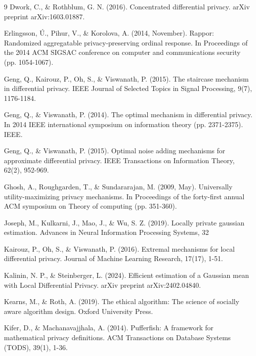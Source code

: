 \documentclass[a4paper, 11pt]{article}
\theoremstyle{definition}
\begin{document}
{\begin{thebibliography}{9}
 Dwork, C., \& Rothblum, G. N. (2016). Concentrated differential privacy. arXiv preprint arXiv:1603.01887.

 Erlingsson, Ú., Pihur, V., \& Korolova, A. (2014, November). Rappor: Randomized aggregatable privacy-preserving ordinal response. In Proceedings of the 2014 ACM SIGSAC conference on computer and communications security (pp. 1054-1067).

 Geng, Q., Kairouz, P., Oh, S., \& Viswanath, P. (2015). The staircase mechanism in differential privacy. IEEE Journal of Selected Topics in Signal Processing, 9(7), 1176-1184.

 Geng, Q., \& Viswanath, P. (2014). The optimal mechanism in differential privacy. In 2014 IEEE international symposium on information theory (pp. 2371-2375). IEEE.

 Geng, Q., \& Viswanath, P. (2015). Optimal noise adding mechanisms for approximate differential privacy. IEEE Transactions on Information Theory, 62(2), 952-969.

 Ghosh, A., Roughgarden, T., \& Sundararajan, M. (2009, May). Universally utility-maximizing privacy mechanisms. In Proceedings of the forty-first annual ACM symposium on Theory of computing (pp. 351-360).

 Joseph, M., Kulkarni, J., Mao, J., \& Wu, S. Z. (2019). Locally private gaussian estimation. Advances in Neural Information Processing Systems, 32


 Kairouz, P., Oh, S., \& Viswanath, P. (2016). Extremal mechanisms for local differential privacy. Journal of Machine Learning Research, 17(17), 1-51.

 Kalinin, N. P., \& Steinberger, L. (2024). Efficient estimation of a Gaussian mean with Local Differential Privacy. arXiv preprint arXiv:2402.04840.

 Kearns, M., \& Roth, A. (2019). The ethical algorithm: The science of socially aware algorithm design. Oxford University Press.

 Kifer, D., \& Machanavajjhala, A. (2014). Pufferfish: A framework for mathematical privacy definitions. ACM Transactions on Database Systems (TODS), 39(1), 1-36. 


\end{thebibliography}}
\end{document}
